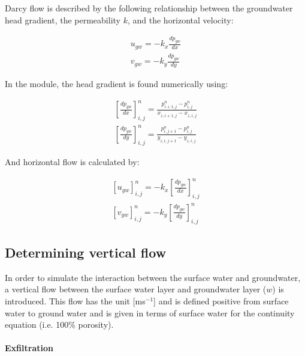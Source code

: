Darcy flow is described by the following relationship between the groundwater head gradient, the permeability $k$, and the horizontal velocity:

\begin{equation} \label{2.83)} 
\begin{array}{l} {u_{gw} =-k_{x} \frac{dp_{gw} }{dx} } \\ {v_{gw} =-k_{y} \frac{dp_{gw} }{dy} } \end{array} 
\end{equation} 

In the module, the head gradient is found numerically using:

\begin{equation} \label{2.84)} 
\begin{array}{l} {\left[\frac{dp_{gw} }{dx} \right]_{i,j}^{n} =\frac{p_{i+1,j}^{n} -p_{i,j}^{n} }{x_{z,i+1,j}^{} -x_{z,i,j}^{} } } \\ {\left[\frac{dp_{gw} }{dy} \right]_{i,j}^{n} =\frac{p_{i,j+1}^{n} -p_{i,j}^{n} }{y_{z,i,j+1}^{} -y_{z,i,j}^{} } } \end{array} 
\end{equation} 

And horizontal flow is calculated by:

\begin{equation} \label{2.85)} 
\begin{array}{l} {\left[u_{gw} \right]_{i,j}^{n} =-k_{x} \left[\frac{dp_{gw} }{dx} \right]_{i,j}^{n} } \\ {\left[v_{gw} \right]_{i,j}^{n} =-k_{y} \left[\frac{dp_{gw} }{dy} \right]_{i,j}^{n} } \end{array} 
\end{equation} 

\subsection{ Determining vertical flow}

In order to simulate the interaction between the surface water and groundwater, a vertical flow between the surface water layer and groundwater layer ($w$) is introduced. This flow has the unit [ms${}^{-1}$] and is defined positive from surface water to ground water and is given in terms of surface water for the continuity equation (i.e. 100\% porosity). 

\paragraph{Exfiltration}

